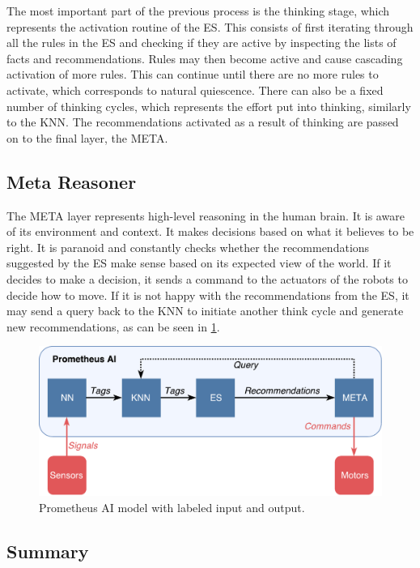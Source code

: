 \documentclass[titlepage,11pt]{article}
\begin{document}
The most important part of the previous process is the thinking stage, which represents the activation routine of the ES. This consists of first iterating through all the rules in the ES and checking if they are active by inspecting the lists of facts and recommendations. Rules may then become active and cause cascading activation of more rules. This can continue until there are no more rules to activate, which corresponds to natural quiescence. There can also be a fixed number of thinking cycles, which represents the effort put into thinking, similarly to the KNN. The recommendations activated as a result of thinking are passed on to the final layer, the META.

\subsection{Meta Reasoner}

The META layer represents high-level reasoning in the human brain. It is aware of its environment and context. It makes decisions based on what it believes to be right. It is paranoid and constantly checks whether the recommendations suggested by the ES make sense based on its expected view of the world. If it decides to make a decision, it sends a command to the actuators of the robots to decide how to move. If it is not happy with the recommendations from the ES, it may send a query back to the KNN to initiate another think cycle and generate new recommendations, as can be seen in \cref{model_labeled}.

\begin{figure}[!htb]
	\includegraphics[width=\textwidth]{figures/ai_model_labeled.pdf}
	\caption{Prometheus AI model with labeled input and output.}
	\label{model_labeled}
\end{figure}

\subsection{Summary}
\end{document}
